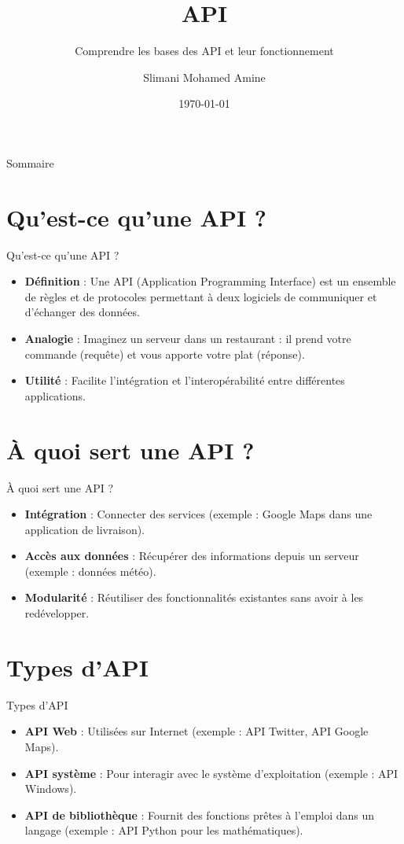 \documentclass{clbeamer2024}
\title{\textbf{API}}
\subtitle{Comprendre les bases des API et leur fonctionnement}
\author{Slimani Mohamed Amine}
\institute{}
\date{\today}
\begin{document}
\setcounter{framenumber}{-1}
\frame{\titlepage}



\begin{frame}{Sommaire}
	\tableofcontents
\end{frame}

\section{Qu'est-ce qu'une API ?}
\begin{frame}{Qu'est-ce qu'une API ?}
	\begin{itemize}
		\item \textbf{Définition} : Une API (Application Programming Interface) est un ensemble de règles et de protocoles permettant à deux logiciels de communiquer et d'échanger des données.
		\item \textbf{Analogie} : Imaginez un serveur dans un restaurant : il prend votre commande (requête) et vous apporte votre plat (réponse).
		\item \textbf{Utilité} : Facilite l'intégration et l'interopérabilité entre différentes applications.
	\end{itemize}
\end{frame}

\section{À quoi sert une API ?}
\begin{frame}{À quoi sert une API ?}
	\begin{itemize}
		\item \textbf{Intégration} : Connecter des services (exemple : Google Maps dans une application de livraison).
		\item \textbf{Accès aux données} : Récupérer des informations depuis un serveur (exemple : données météo).
		\item \textbf{Modularité} : Réutiliser des fonctionnalités existantes sans avoir à les redévelopper.
	\end{itemize}
\end{frame}

\section{Types d'API}
\begin{frame}{Types d'API}
	\begin{itemize}
		\item \textbf{API Web} : Utilisées sur Internet (exemple : API Twitter, API Google Maps).
		\item \textbf{API système} : Pour interagir avec le système d'exploitation (exemple : API Windows).
		\item \textbf{API de bibliothèque} : Fournit des fonctions prêtes à l'emploi dans un langage (exemple : API Python pour les mathématiques).
	\end{itemize}
\end{frame}
\end{document}
